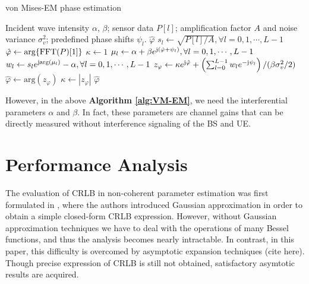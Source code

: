 \documentclass[12pt,draftclsnofoot,journal,onecolumn]{IEEEtran}
\theoremstyle{nonumberplain}
\def \arg {\text{arg}}
\begin{document}
    \begin{algorithm}[H] 
        \caption{von Mises-EM phase estimation} \label{alg:VM-EM}
        \begin{algorithmic}[1]
            \REQUIRE Incident wave intensity $\alpha$, $\beta$; sensor data $P[l]$; amplification factor $A$ and noise variance $\sigma_v^2$; predefined phase shifts $\psi_l$.
            \ENSURE $\hat{\varphi}$
            \STATE $s_l \leftarrow \sqrt{P[l]/A}, \forall l=0,1,\cdots,L-1$
            \STATE $\hat{\varphi} \leftarrow \arg\{{\rm FFT}(P)[1]\}$
            \STATE $\kappa \leftarrow 1$
                \STATE $\mu_l \leftarrow \alpha + \beta e^{{\rm j} (\hat{\varphi}+\psi_l)}, \forall l=0,1,\cdots,L-1$
                \STATE $w_l \leftarrow s_l e^{{\rm j} \arg(\mu_l)} - \alpha, \forall l=0,1,\cdots,L-1$
                \STATE $z_\varphi \leftarrow \kappa e^{{\rm j} \hat{\varphi}} + \left( \sum_{l=0}^{L-1}{w_l e^{-{\rm j} \psi_l}}\right) / (\beta \sigma_v^2/2)$
                \STATE $\hat{\varphi} \leftarrow \arg(z_\varphi)$
                \STATE $\kappa \leftarrow |z_\varphi|$
            \ENDWHILE
            \RETURN $\hat{\varphi}$
        \end{algorithmic}
    \end{algorithm}

    However, in the above {\bf Algorithm \ref{alg:VM-EM}}, we need the interferential parameters $\alpha$ and $\beta$. In fact, these parameters are channel gains that can be directly measured without interference signaling of the BS and UE. 
    
\section{Performance Analysis}
\label{Performance Analysis}
    The evaluation of CRLB in non-coherent parameter estimation was first formulated in \cite{jiang2016cramer}, where the authors introduced Gaussian approximation in order to obtain a simple closed-form CRLB expression. However, without Gaussian approximation techniques we have to deal with the operations of many Bessel functions, and thus the analysis becomes nearly intractable. In contrast, in this paper, this difficulty is overcomed by asymptotic expansion techniques (cite here). Though precise expression of CRLB is still not obtained, satisfactory asymtotic results are acquired. 
    
\end{document}
